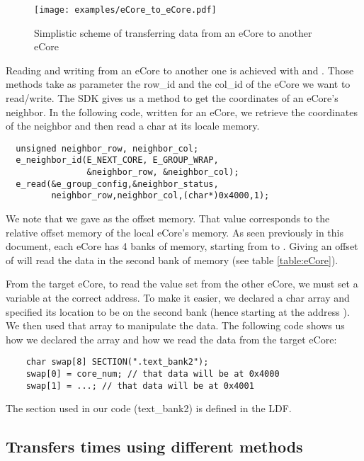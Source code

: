 \begin{figure}[h!]
\centering
\texttt{[image: examples/eCore\_to\_eCore.pdf]}
\caption{Simplistic scheme of transferring data from an \gls{eCore} to another \gls{eCore}}
\label{fig eCore to eCore}
\end{figure}

Reading and writing from an \gls{eCore} to another one is achieved with  and . Those methods take as parameter the row\_id and the col\_id of the \gls{eCore} we want to read/write. The \gls{SDK} gives us a method to get the coordinates of an \gls{eCore}'s neighbor. In the following code, written for an \gls{eCore}, we retrieve the coordinates of the neighbor and then read a char at its locale memory.

\begin{lstlisting}
  unsigned neighbor_row, neighbor_col;
  e_neighbor_id(E_NEXT_CORE, E_GROUP_WRAP, 
                &neighbor_row, &neighbor_col);
  e_read(&e_group_config,&neighbor_status,
         neighbor_row,neighbor_col,(char*)0x4000,1);
\end{lstlisting}

We note that we gave  as the offset memory. That value corresponds to the relative offset memory of the local \gls{eCore}'s memory. As seen previously in this document, each \gls{eCore} has 4 banks of memory, starting from  to . Giving an offset of  will read the data in the second bank of memory (see table \ref{table:eCore}).

From the target \gls{eCore}, to read the value set from the other \gls{eCore}, we must set a variable at the correct address. To make it easier, we declared a char array and specified its location to be on the second bank (hence starting at the address ). We then used that array to manipulate the data. The following code shows us how we declared the array and how we read the data from the target \gls{eCore}:

\begin{lstlisting}
	char swap[8] SECTION(".text_bank2");
	swap[0] = core_num; // that data will be at 0x4000
	swap[1] = ...; // that data will be at 0x4001
\end{lstlisting}

The section used in our code (text\_bank2) is defined in the \gls{LDF}.

\subsection{Transfers times using different methods}

